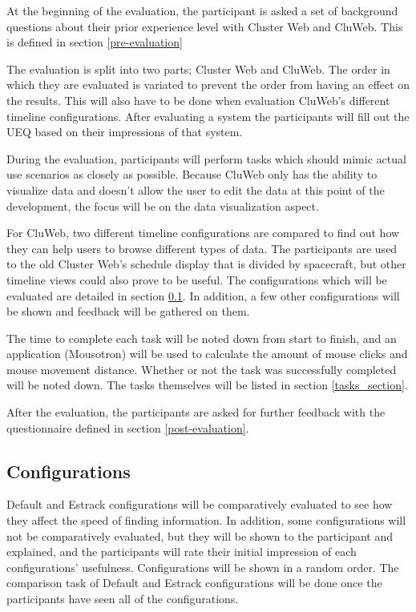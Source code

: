 At the beginning of the evaluation, the participant is asked a set of background questions about their prior experience level with Cluster Web and CluWeb. This is defined in section \ref{pre-evaluation}

The evaluation is split into two parts; Cluster Web and CluWeb. The order in which they are evaluated is variated to prevent the order from having an effect on the results. This will also have to be done when evaluation CluWeb's different timeline configurations. After evaluating a system the participants will fill out the UEQ based on their impressions of that system. \cite{laugwitz2008construction}

During the evaluation, participants will perform tasks which should mimic actual use scenarios as closely as possible. Because CluWeb only has the ability to visualize data and doesn't allow the user to edit the data at this point of the development, the focus will be on the data visualization aspect. 

For CluWeb, two different timeline configurations are compared to find out how they can help users to browse different types of data. The participants are used to the old Cluster Web's schedule display that is divided by spacecraft, but other timeline views could also prove to be useful. The configurations which will be evaluated are detailed in section \ref{configurations_section}. In addition, a few other configurations will be shown and feedback will be gathered on them.

The time to complete each task will be noted down from start to finish, and an application (Mousotron) \cite{mousotron} will be used to calculate the amount of mouse clicks and mouse movement distance. Whether or not the task was successfully completed will be noted down. The tasks themselves will be listed in section \ref{tasks_section}.

After the evaluation, the participants are asked for further feedback with the questionnaire defined in section \ref{post-evaluation}.

\subsection{Configurations} \label{configurations_section}
Default and Estrack configurations will be comparatively evaluated to see how they affect the speed of finding information. In addition, some configurations will not be comparatively evaluated, but they will be shown to the participant and explained, and the participants will rate their initial impression of each configurations' usefulness. Configurations will be shown in a random order. The comparison task of Default and Estrack configurations will be done once the participants have seen all of the configurations.

